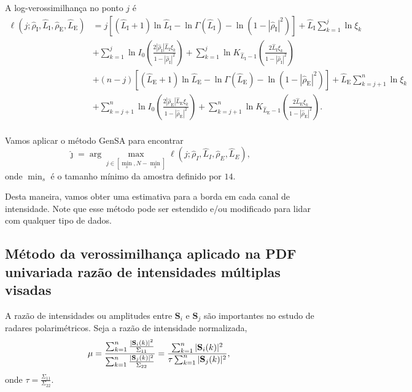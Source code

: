 A log-verossimilhança no ponto $j$ é
\begin{equation}\label{eq:TotalLogLikelihood}
\begin{split}
\ell(j;\widehat{\rho}_\text{I}, \widehat{L}_\text{I}, \widehat{\rho}_\text{E}, \widehat{L}_\text{E})&
=j\left[(\widehat{L}_\text{I}+1)\ln \widehat{L}_\text{I}-\ln\Gamma(\widehat{L}_\text{I})-\ln(1-|\widehat{\rho}_\text{I}|^2)\right]
+\widehat{L}_\text{I}\sum_{k=1}^{j} \ln\xi_k\\
&+\sum_{k=1}^{j}\ln I_0\left(\frac{2|\widehat{\rho}_\text{I}|\widehat{L}_\text{I}\xi_k}{1-|\widehat{\rho}_\text{I}|^2}\right)
+ \sum_{k=1}^{j}\ln K_{\widehat{L}_\text{I}-1}\left(\frac{2\widehat{L}_\text{I}\xi_k}{1-|\widehat{\rho}_\text{I}|^2}\right)\\
&+(n-j)\left[(\widehat{L}_\text{E}+1)\ln \widehat{L}_\text{E}-\ln\Gamma(\widehat{L}_\text{E})-\ln(1-|\widehat{\rho}_\text{E}|^2)\right]
+\widehat{L}_\text{E}\sum_{k=j+1}^{n} \ln\xi_k\\
&+\sum_{k=j+1}^{n}\ln I_0\left(\frac{2|\widehat{\rho}_\text{E}|\widehat{L}_\text{E}\xi_k}{1-|\widehat{\rho}_\text{E}|^2}\right)
+ \sum_{k=j+1}^{n}\ln K_{\widehat{L}_\text{E}-1}\left(\frac{2\widehat{L}_\text{E}\xi_k}{1-|\widehat{\rho}_\text{E}|^2}\right).\\
\end{split}
\end{equation}

Vamos aplicar o método GenSA para encontrar
$$
\widehat{\jmath}= \arg\max\limits_{j\in [\min_s,N-\min_s]}\ell(j;\widehat{\rho}_I, \widehat{L}_I,\widehat{\rho}_E, \widehat{L}_E),
$$ 
onde $\min_s$ é o tamanho mínimo da amostra definido por $14$.

Desta maneira, vamos obter uma estimativa para a borda em cada canal de intensidade.
Note que esse método pode ser estendido e/ou modificado para lidar com qualquer tipo de dados.

\subsection{Método da verossimilhança aplicado na PDF univariada razão de intensidades múltiplas visadas}
A razão de intensidades ou amplitudes entre $\mathbf{S}_i$ e $\mathbf{S}_j$ são importantes no estudo de radares polarimétricos. Seja a razão de intensidade normalizada,
\begin{equation}\label{eq:razao_intensidades}
 \mu=\frac{\sum_{k=1}^{n}\frac{|\mathbf{S}_i(k)|^2}{\Sigma_{11}}}{\sum_{k=1}^{n}\frac{|\mathbf{S}_j(k)|^2}{\Sigma_{22}}}=\frac{\sum_{k=1}^{n}|\mathbf{S}_i(k)|^2}{\tau\sum_{k=1}^{n}|\mathbf{S}_j(k)|^2},\\
\end{equation}
onde $\tau=\frac{\Sigma_{11}}{\Sigma_{22}}$.
  

